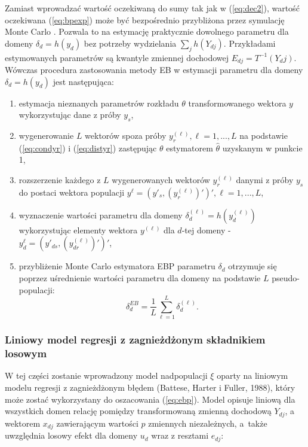 Zamiast wprowadzać wartość oczekiwaną do sumy tak jak w (\ref{eq:dec2}), wartość oczekiwana (\ref{eq:bpexp}) może być bezpośrednio przybliżona przez symulację Monte Carlo \citep{ebp2010}. Pozwala to na estymację praktycznie dowolnego parametru dla domeny $\delta_d=h(y_d)$ bez potrzeby wydzielania $\sum\limits_{j}{h(Y_{dj})}$. Przykładami estymowanych parametrów są kwantyle zmiennej dochodowej $E_{dj}=T^{-1}(Y_dj)$. Wówczas procedura zastosowania metody EB w estymacji parametru dla domeny $\delta_d=h(y_d)$ jest następująca:

\begin{enumerate}
\item estymacja nieznanych parametrów rozkładu $\theta$ transformowanego wektora $y$ wykorzystując dane z próby $y_s$,
\item wygenerowanie $L$ wektorów spoza próby $y_r^{(\ell)},\ell=1,...,L$ na podstawie (\ref{eq:condyr}) i (\ref{eq:distyr}) zastępując $\theta$ estymatorem $\hat{\theta}$ uzyskanym w punkcie 1,
\item rozszerzenie każdego z $L$ wygenerowanych wektorów $y_r^{(\ell)}$ danymi z próby $y_s$ do postaci wektora populacji $y^{\ell}=(y'_s,(y_r^{(\ell)})')', \ell=1,...,L$,
\item wyznaczenie wartości parametru dla domeny $\delta^{(\ell)}_d=h(y_d^{(\ell)})$ wykorzystując elementy wektora $y^{(\ell)}$ dla $d$-tej domeny - $y_d^{\ell}=(y'_{ds},(y_{dr}^{(\ell)})')'$,
\item przybliżenie Monte Carlo estymatora EBP parametru $\delta_d$ otrzymuje się poprzez uśrednienie wartości parametru dla domeny na podstawie $L$ pseudo-populacji:
\begin{equation}
\delta^{EB}_d=\frac{1}{L}\sum\limits_{\ell=1}^{L}{\delta_d^{(\ell)}}.
\end{equation}
\end{enumerate}


\subsubsection{Liniowy model regresji z zagnieżdżonym składnikiem losowym}

W tej części zostanie wprowadzony model nadpopulacji $\xi$ oparty na liniowym modelu regresji z zagnieżdżonym błędem (Battese, Harter i Fuller, 1988), który może zostać wykorzystany do oszacowania (\ref{eq:ebp}). Model opisuje liniową dla wszystkich domen relację pomiędzy transformowaną zmienną dochodową $Y_{dj}$, a wektorem $x_{dj}$ zawierającym wartości $p$ zmiennych niezależnych, a~także uwzględnia losowy efekt dla domeny $u_d$ wraz z resztami $e_{dj}$:

